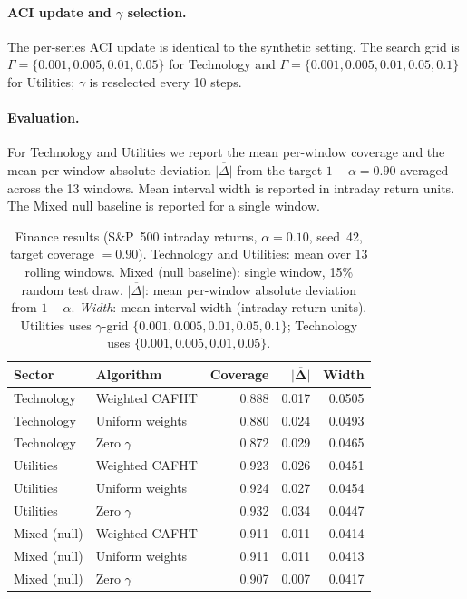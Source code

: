 \documentclass{article}
\numberwithin{equation}{section}
\begin{document}
\paragraph{ACI update and $\gamma$ selection.}
The per-series ACI update is identical to the synthetic setting.  The search
grid is $\Gamma = \{0.001, 0.005, 0.01, 0.05\}$ for Technology and
$\Gamma = \{0.001, 0.005, 0.01, 0.05, 0.1\}$ for Utilities; $\gamma$ is
reselected every 10 steps.

\paragraph{Evaluation.}
For Technology and Utilities we report the mean per-window coverage and the
mean per-window absolute deviation $\overline{|\Delta|}$ from the target
$1-\alpha = 0.90$ averaged across the 13 windows.  Mean interval width is
reported in intraday return units.  The Mixed null baseline is reported for a
single window.

\begin{table}[ht]
\centering
\small
\setlength{\tabcolsep}{8pt}
\renewcommand{\arraystretch}{1.15}
\caption{%
  Finance results (S\&P~500 intraday returns, $\alpha=0.10$, seed~42, target
  coverage $= 0.90$).
  Technology and Utilities: mean over 13 rolling windows.
  Mixed (null baseline): single window, 15\% random test draw.
  $\overline{|\Delta|}$: mean per-window absolute deviation from $1-\alpha$.
  \textit{Width}: mean interval width (intraday return units).
  Utilities uses $\gamma$-grid $\{0.001, 0.005, 0.01, 0.05, 0.1\}$;
  Technology uses $\{0.001, 0.005, 0.01, 0.05\}$.
}
\label{tab:finance}
\begin{tabular}{@{} llrrr @{}}
\toprule
{\bfseries Sector} & {\bfseries Algorithm}
  & {\bfseries Coverage} & $\boldsymbol{\overline{|\Delta|}}$ & {\bfseries Width} \\
\midrule
Technology
  & Weighted CAFHT      & 0.888 & 0.017 & 0.0505 \\
Technology
  & Uniform weights     & 0.880 & 0.024 & 0.0493 \\
Technology
  & Zero $\gamma$       & 0.872 & 0.029 & 0.0465 \\
\midrule
Utilities
  & Weighted CAFHT      & 0.923 & 0.026 & 0.0451 \\
Utilities
  & Uniform weights     & 0.924 & 0.027 & 0.0454 \\
Utilities
  & Zero $\gamma$       & 0.932 & 0.034 & 0.0447 \\
\midrule
Mixed (null)
  & Weighted CAFHT      & 0.911 & 0.011 & 0.0414 \\
Mixed (null)
  & Uniform weights     & 0.911 & 0.011 & 0.0413 \\
Mixed (null)
  & Zero $\gamma$       & 0.907 & 0.007 & 0.0417 \\
\bottomrule
\end{tabular}
\end{table}
\end{document}
